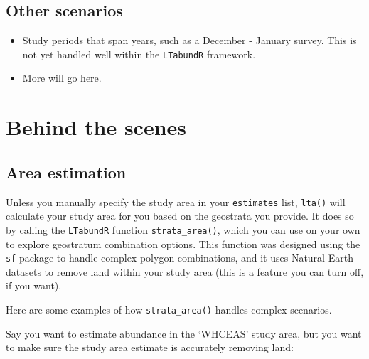 \documentclass[
]{book}
\newenvironment{Shaded}{\begin{snugshade}}{\end{snugshade}}
\newcommand{\DataTypeTok}[1]{\textcolor[rgb]{0.13,0.29,0.53}{#1}}
\newcommand{\KeywordTok}[1]{\textcolor[rgb]{0.13,0.29,0.53}{\textbf{#1}}}
\newcommand{\NormalTok}[1]{#1}
\newcommand{\OperatorTok}[1]{\textcolor[rgb]{0.81,0.36,0.00}{\textbf{#1}}}
\newcommand{\OtherTok}[1]{\textcolor[rgb]{0.56,0.35,0.01}{#1}}
\newcommand{\StringTok}[1]{\textcolor[rgb]{0.31,0.60,0.02}{#1}}
\begin{document}
\hypertarget{other-scenarios}{%
\subsection*{Other scenarios}\label{other-scenarios}}

\begin{itemize}
\item
  Study periods that span years, such as a December - January survey. This is not yet handled well within the \texttt{LTabundR} framework.
\item
  More will go here.
\end{itemize}

\hypertarget{behind-the-scenes-1}{%
\section*{Behind the scenes}\label{behind-the-scenes-1}}

\hypertarget{area-estimation}{%
\subsection*{Area estimation}\label{area-estimation}}

Unless you manually specify the study area in your \texttt{estimates} list, \texttt{lta()} will calculate your study area for you based on the geostrata you provide. It does so by calling the \texttt{LTabundR} function \texttt{strata\_area()}, which you can use on your own to explore geostratum combination options. This function was designed using the \texttt{sf} package to handle complex polygon combinations, and it uses Natural Earth datasets to remove land within your study area (this is a feature you can turn off, if you want).

Here are some examples of how \texttt{strata\_area()} handles complex scenarios.

Say you want to estimate abundance in the `WHCEAS' study area, but you want to make sure the study area estimate is accurately removing land:

\begin{Shaded}
\end{Shaded}
\end{document}
